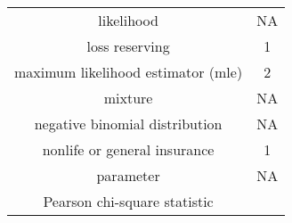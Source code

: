\documentclass[]{book}
\theoremstyle{definition}
\theoremstyle{definition}
\theoremstyle{definition}
\theoremstyle{remark}
\begin{document}
\begin{longtable}[]{@{}cc@{}}
\begin{minipage}[t]{0.43\columnwidth}\centering\strut
likelihood\strut
\end{minipage} & \begin{minipage}[t]{0.05\columnwidth}\centering\strut
NA\strut
\end{minipage}\tabularnewline
\begin{minipage}[t]{0.43\columnwidth}\centering\strut
loss reserving\strut
\end{minipage} & \begin{minipage}[t]{0.05\columnwidth}\centering\strut
1\strut
\end{minipage}\tabularnewline
\begin{minipage}[t]{0.43\columnwidth}\centering\strut
maximum likelihood estimator (mle)\strut
\end{minipage} & \begin{minipage}[t]{0.05\columnwidth}\centering\strut
2\strut
\end{minipage}\tabularnewline
\begin{minipage}[t]{0.43\columnwidth}\centering\strut
mixture\strut
\end{minipage} & \begin{minipage}[t]{0.05\columnwidth}\centering\strut
NA\strut
\end{minipage}\tabularnewline
\begin{minipage}[t]{0.43\columnwidth}\centering\strut
negative binomial distribution\strut
\end{minipage} & \begin{minipage}[t]{0.05\columnwidth}\centering\strut
NA\strut
\end{minipage}\tabularnewline
\begin{minipage}[t]{0.43\columnwidth}\centering\strut
nonlife or general insurance\strut
\end{minipage} & \begin{minipage}[t]{0.05\columnwidth}\centering\strut
1\strut
\end{minipage}\tabularnewline
\begin{minipage}[t]{0.43\columnwidth}\centering\strut
parameter\strut
\end{minipage} & \begin{minipage}[t]{0.05\columnwidth}\centering\strut
NA\strut
\end{minipage}\tabularnewline
\begin{minipage}[t]{0.43\columnwidth}\centering\strut
Pearson chi-square statistic\strut
\end{minipage} & \begin{minipage}[t]{0.05\columnwidth}\centering\strut

\end{minipage}
\end{longtable}
\end{document}
